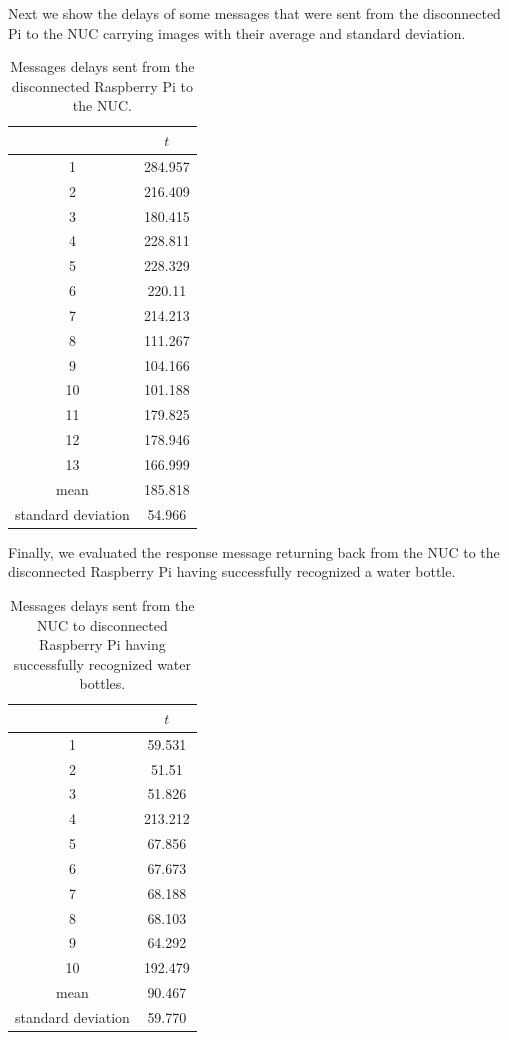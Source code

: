 Next we show the delays of some messages that were sent from the disconnected Pi to the NUC carrying images with their average and standard deviation.
\begin{table}[H]
	\centering
\begin{tabular}{*{2}{c}}\toprule
		  & $t$  \\ \midrule
1&	284.957\\
2&	216.409\\
3&	180.415\\
4&	228.811\\
5&	228.329\\
6&	220.11\\
7&	214.213\\
8&	111.267\\
9&	104.166\\
10&	101.188\\
11&	179.825\\
12&	178.946\\
13&	166.999\\
mean&	185.818\\
standard deviation&	54.966\\
\end{tabular}
	\caption{Messages delays sent from the disconnected Raspberry Pi to the NUC.}
	\label{table:DIS2}
\end{table}

\noindent Finally, we evaluated the response message returning back from the NUC to the disconnected Raspberry Pi having successfully recognized a water bottle.

\begin{table}[H]
	\centering
	\begin{tabular}{*{2}{c}}\toprule
		& $t$  \\ \midrule
1&	59.531\\
2&	51.51\\
3&	51.826\\
4&	213.212\\
5&	67.856\\
6&	67.673\\
7&	68.188\\
8&	68.103\\
9&	64.292\\
10&	192.479\\
mean& 	90.467\\
standard deviation&	59.770\\
	\end{tabular}
	\caption{Messages delays sent from the NUC to disconnected Raspberry Pi having successfully recognized water bottles.}
	\label{table:DIS3}
\end{table}


